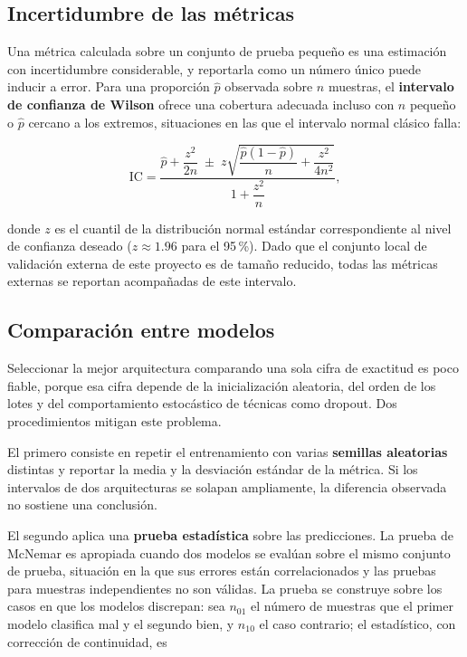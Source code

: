 \subsection{Incertidumbre de las métricas}

Una métrica calculada sobre un conjunto de prueba pequeño es una
estimación con incertidumbre considerable, y reportarla como un número
único puede inducir a error. Para una proporción $\hat{p}$ observada sobre
$n$ muestras, el \textbf{intervalo de confianza de Wilson}
\citep{wilson1927} ofrece una cobertura adecuada incluso con $n$ pequeño o
$\hat{p}$ cercano a los extremos, situaciones en las que el intervalo normal
clásico falla:

\begin{equation}
\mathrm{IC} = \frac{\hat{p} + \dfrac{z^{2}}{2n} \;\pm\; z\sqrt{\dfrac{\hat{p}(1-\hat{p})}{n} + \dfrac{z^{2}}{4n^{2}}}}
                   {1 + \dfrac{z^{2}}{n}},
\label{eq:wilson}
\end{equation}

\noindent donde $z$ es el cuantil de la distribución normal estándar
correspondiente al nivel de confianza deseado ($z \approx 1.96$ para el
95\,\%). Dado que el conjunto local de validación externa de este proyecto
es de tamaño reducido, todas las métricas externas se reportan acompañadas
de este intervalo.

\subsection{Comparación entre modelos}

Seleccionar la mejor arquitectura comparando una sola cifra de exactitud es
poco fiable, porque esa cifra depende de la inicialización aleatoria, del
orden de los lotes y del comportamiento estocástico de técnicas como
dropout. Dos procedimientos mitigan este problema.

El primero consiste en repetir el entrenamiento con varias
\textbf{semillas aleatorias} distintas y reportar la media y la desviación
estándar de la métrica. Si los intervalos de dos arquitecturas se solapan
ampliamente, la diferencia observada no sostiene una conclusión.

El segundo aplica una \textbf{prueba estadística} sobre las predicciones.
La prueba de McNemar \citep{mcnemar1947} es apropiada cuando dos modelos se
evalúan sobre el mismo conjunto de prueba, situación en la que sus errores
están correlacionados y las pruebas para muestras independientes no son
válidas. La prueba se construye sobre los casos en que los modelos
discrepan: sea $n_{01}$ el número de muestras que el primer modelo clasifica
mal y el segundo bien, y $n_{10}$ el caso contrario; el estadístico, con
corrección de continuidad, es

